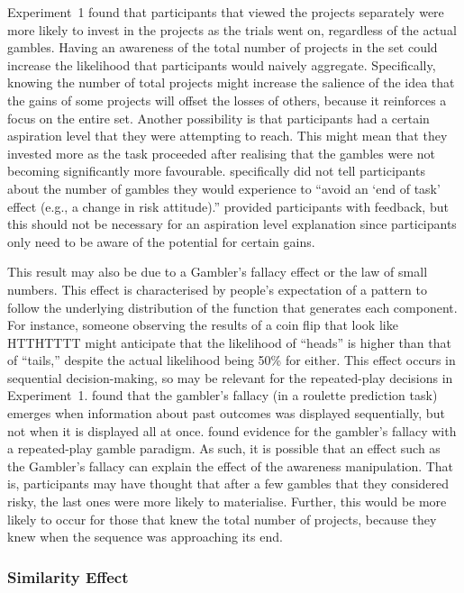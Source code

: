 \documentclass[a4paper, nobind]{templates/ociamthesis}
\theoremstyle{definition}
\theoremstyle{definition}
\theoremstyle{definition}
\theoremstyle{definition}
\theoremstyle{remark}
\begin{document}
Experiment~1 found that participants that viewed the projects separately were
more likely to invest in the projects as the trials went on, regardless of the
actual gambles. Having an awareness of the total number of projects in the set
could increase the likelihood that participants would naively aggregate.
Specifically, knowing the number of total projects might increase the salience
of the idea that the gains of some projects will offset the losses of others,
because it reinforces a focus on the entire set. Another possibility is that
participants had a certain aspiration level \autocite{lopes1996} that they were
attempting to reach. This might mean that they invested more as the task
proceeded after realising that the gambles were not becoming significantly more
favourable. \textcite[p.~219]{barron2003} specifically did not tell participants about
the number of gambles they would experience to ``avoid an `end of task' effect
(e.g., a change in risk attitude).'' \textcite{barron2003} provided participants with
feedback, but this should not be necessary for an aspiration level explanation
since participants only need to be aware of the potential for certain gains.

This result may also be due to a Gambler's fallacy effect or the law of small
numbers. This effect is characterised by people's expectation of a pattern to
follow the underlying distribution of the function that generates each
component. For instance, someone observing the results of a coin flip that look
like HTTHTTTT might anticipate that the likelihood of ``heads'' is higher than
that of ``tails,'' despite the actual likelihood being 50\% for either. This effect
occurs in sequential decision-making, so may be relevant for the repeated-play
decisions in Experiment~1. \textcite{barron2010} found that the gambler's fallacy (in a
roulette prediction task) emerges when information about past outcomes was
displayed sequentially, but not when it is displayed all at once. \textcite{haisley2008}
found evidence for the gambler's fallacy with a repeated-play gamble paradigm.
As such, it is possible that an effect such as the Gambler's fallacy can explain
the effect of the awareness manipulation. That is, participants may have thought
that after a few gambles that they considered risky, the last ones were more
likely to materialise. Further, this would be more likely to occur for those
that knew the total number of projects, because they knew when the sequence was
approaching its end.

\hypertarget{similarity-discussion-aggregation-1}{%
\subsubsection{Similarity Effect}\label{similarity-discussion-aggregation-1}}
\end{document}
